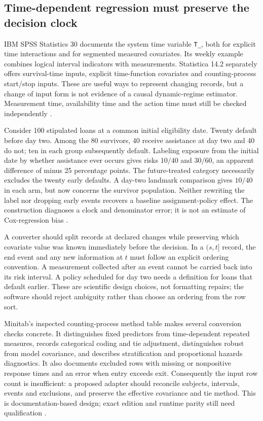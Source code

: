 \subsection{Time-dependent regression must preserve the decision clock}

IBM SPSS Statistics 30 documents the system time variable \texttt{T\_},
both for explicit time interactions and for segmented measured covariates.
Its weekly example combines logical interval indicators with measurements.
Statistica 14.2 separately offers survival-time inputs, explicit time-function
covariates and counting-process start/stop inputs. These are useful ways to
represent changing records, but a change of input form is not evidence of a
causal dynamic-regime estimator. Measurement time, availability time and the
action time must still be checked independently
\citep{exec14_survival_ibm,exec14_survival_statistica}.

Consider 100 stipulated loans at a common initial eligibility date. Twenty
default before day two. Among the 80 survivors, 40 receive assistance at day
two and 40 do not; ten in each group subsequently default. Labeling exposure
from the initial date by whether assistance ever occurs gives risks $10/40$
and $30/60$, an apparent difference of minus 25 percentage points. The
future-treated category necessarily excludes the twenty early defaults.
A day-two landmark comparison gives $10/40$ in each arm, but now concerns
the survivor population. Neither rewriting the label nor dropping early events
recovers a baseline assignment-policy effect. The construction diagnoses a
clock and denominator error; it is not an estimate of Cox-regression bias
\citep{exec14_survival_exact}.

A converter should split records at declared changes while preserving which
covariate value was known immediately before the decision. In a $(s,t]$
record, the end event and any new information at $t$ must follow an explicit
ordering convention. A measurement collected after an event cannot be carried
back into its risk interval. A policy scheduled for day two needs a definition
for loans that default earlier. These are scientific design choices, not
formatting repairs; the software should reject ambiguity rather than choose
an ordering from the row sort.

Minitab's inspected counting-process method table makes several conversion
checks concrete. It distinguishes fixed predictors from time-dependent
repeated measures, records categorical coding and tie adjustment, distinguishes
robust from model covariance, and describes stratification and proportional hazards diagnostics. It also documents excluded rows with missing or
nonpositive response times and an error when entry exceeds exit. Consequently
the input row count is insufficient: a proposed adapter should reconcile
subjects, intervals, events and exclusions, and preserve the effective
covariance and tie method. This is documentation-based design; exact edition
and runtime parity still need qualification \citep{exec14_survival_minitab}.

